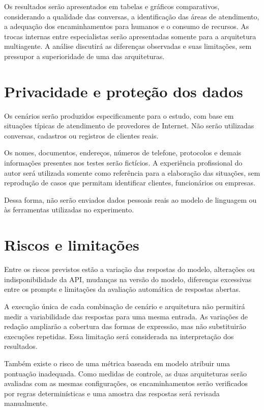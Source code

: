 Os resultados serão apresentados em tabelas e gráficos
comparativos, considerando a qualidade das conversas,
a identificação das áreas de atendimento, a adequação
dos encaminhamentos para humanos e o consumo de recursos.
As trocas internas entre especialistas serão apresentadas
somente para a arquitetura multiagente. A análise discutirá
as diferenças observadas e suas limitações, sem pressupor
a superioridade de uma das arquiteturas.

\section{Privacidade e proteção dos dados}\label{sec:privacidade}

Os cenários serão produzidos especificamente para o estudo, com base em situações típicas de atendimento de provedores de Internet. Não serão utilizadas conversas, cadastros ou registros de clientes reais.

Os nomes, documentos, endereços, números de telefone, protocolos e demais informações presentes nos testes serão fictícios. A experiência profissional do autor será utilizada somente como referência para a elaboração das situações, sem reprodução de casos que permitam identificar clientes, funcionários ou empresas.

Dessa forma, não serão enviados dados pessoais reais ao modelo de linguagem ou às ferramentas utilizadas no experimento.

\section{Riscos e limitações}\label{sec:riscos-limitacoes}

Entre os riscos previstos estão a variação das respostas do modelo, alterações ou indisponibilidade da \gls{API}, mudanças na versão do modelo, diferenças excessivas entre os prompts e limitações da avaliação automática de respostas abertas.

A execução única de cada combinação de cenário e arquitetura
não permitirá medir a variabilidade das respostas para uma
mesma entrada. As variações de redação ampliarão a cobertura
das formas de expressão, mas não substituirão execuções
repetidas. Essa limitação será considerada na interpretação
dos resultados.

Também existe o risco de uma métrica baseada em modelo atribuir uma pontuação inadequada. Como medidas de controle, as duas arquiteturas serão avaliadas com as mesmas configurações, os encaminhamentos serão verificados por regras determinísticas e uma amostra das respostas será revisada manualmente.

